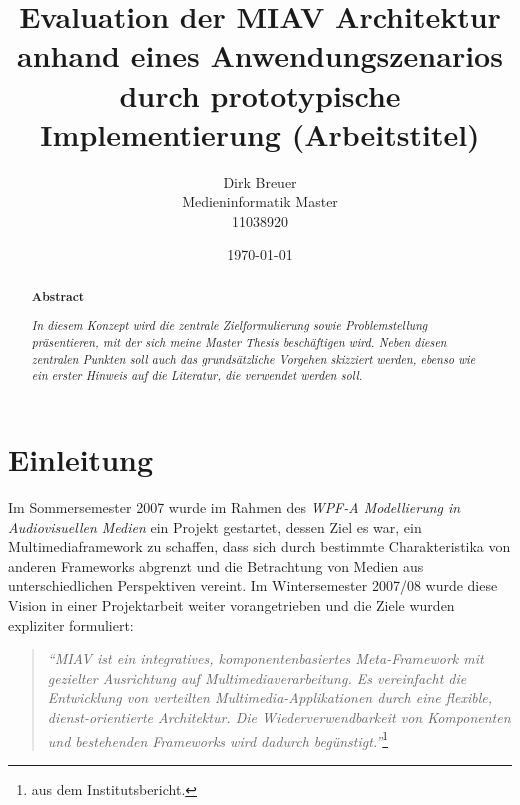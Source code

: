 \documentclass[12pt,headsepline,a4paper,bibtotoc,liststotoc,DIV12,BCOR12mm]{scrartcl}
\title{Evaluation der MIAV Architektur anhand eines Anwendungszenarios durch prototypische Implementierung (Arbeitstitel)}
\author{Dirk Breuer\\Medieninformatik Master\\11038920}
\date{\today}
\begin{document}
  
\dosecttoc

\ifpdf
{}
\else
{}
\fi

\maketitle

\begin{abstract}
  \begin{center}
    \textbf{Abstract\\}
    \vspace{.3cm}
  \end{center}
  \emph{In diesem Konzept wird die zentrale Zielformulierung sowie Problemstellung präsentieren, mit der sich meine Master Thesis beschäftigen wird. Neben diesen zentralen Punkten soll auch das grundsätzliche Vorgehen skizziert werden, ebenso wie ein erster Hinweis auf die Literatur, die verwendet werden soll.}
\end{abstract}
  



\section{Einleitung} %
\label{sec:einleitung}

  Im Sommersemester 2007 wurde im Rahmen des \emph{WPF-A Modellierung in Audiovisuellen Medien} ein Projekt gestartet, dessen Ziel es war, ein Multimediaframework zu schaffen, dass sich durch bestimmte Charakteristika von anderen Frameworks abgrenzt und die Betrachtung von Medien aus unterschiedlichen Perspektiven vereint. Im Wintersemester 2007/08 wurde diese Vision in einer Projektarbeit weiter vorangetrieben und die Ziele wurden expliziter formuliert:
  
  \begin{quote}
    \emph{"`MIAV ist ein integratives, komponentenbasiertes Meta-Framework mit gezielter Ausrichtung auf Multimediaverarbeitung. Es vereinfacht die Entwicklung von verteilten Multimedia-Applikationen durch eine flexible, dienst-orientierte Architektur. Die Wiederverwendbarkeit von Komponenten und bestehenden Frameworks wird dadurch begünstigt."'}\footnote{aus dem Institutsbericht.}
  \end{quote}
  
\end{document}
